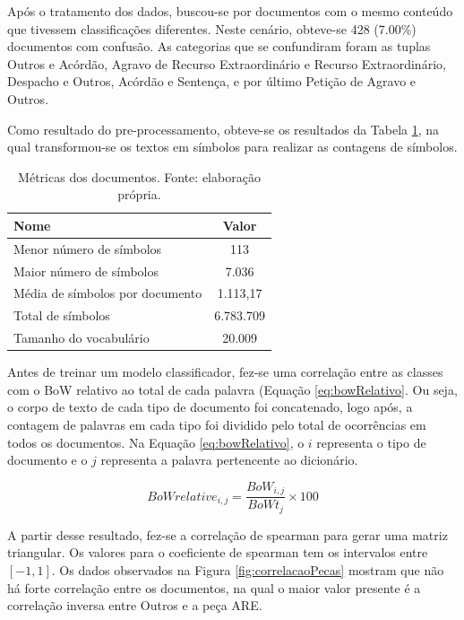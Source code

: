 Após o tratamento dos dados, buscou-se por documentos com o mesmo conteúdo que tivessem classificações diferentes. Neste cenário, obteve-se 428 (7.00\%) documentos com confusão. As categorias que se confundiram foram as tuplas Outros e Acórdão, Agravo de Recurso Extraordinário e Recurso Extraordinário, Despacho e Outros, Acórdão e Sentença, e por último Petição de Agravo e Outros.

Como resultado do pre-processamento, obteve-se os resultados da Tabela \ref{tab:simbolos}, na qual transformou-se os textos em símbolos para realizar as contagens de símbolos.

\begin{table}[h]
	\centering    
	\caption[Métricas dos documentos]{Métricas dos documentos. Fonte: elaboração própria.}
    \label{tab:simbolos}
	\begin{tabular}{|l|c|}
    \hline
    \textbf{Nome} & \textbf{Valor} \\ 
    \hline
    Menor número de símbolos & 113 \\
    \hline
    Maior número de símbolos & 7.036 \\
    \hline
    Média de símbolos por documento & 1.113,17 \\
    \hline
    Total de símbolos & 6.783.709 \\
    \hline
    Tamanho do vocabulário & 20.009 \\
    \hline
    \end{tabular}
\end{table}

Antes de treinar um modelo classificador, fez-se uma correlação entre as classes com o BoW relativo ao total de cada palavra (Equação \ref{eq:bowRelativo}. Ou seja, o corpo de texto de cada tipo de documento foi concatenado, logo após, a contagem de palavras em cada tipo foi dividido pelo total de ocorrências em todos os documentos. Na Equação \ref{eq:bowRelativo}, o $i$ representa o tipo de documento e o $j$ representa a palavra pertencente ao dicionário.

\begin{equation}
\label{eq:bowRelativo}
	BoWrelative_{i,j} = \frac{BoW_{i,j}}{BoWt_{j}} \times 100
\end{equation}

A partir desse resultado, fez-se a correlação de spearman para gerar uma matriz triangular. Os valores para o coeficiente de spearman tem os intervalos entre $[-1,1]$. Os dados observados na Figura \ref{fig:correlacaoPecas} mostram que não há forte correlação entre os documentos, na qual o maior valor presente é a correlação inversa entre Outros e a peça ARE.

